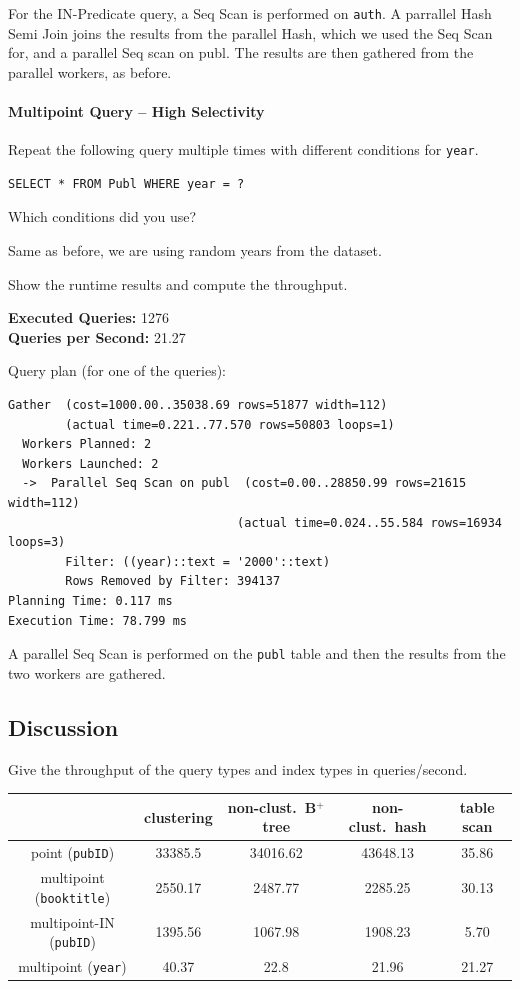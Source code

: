 \documentclass[11pt]{scrartcl}
\begin{document}
For the IN-Predicate query, a Seq Scan is performed on \texttt{auth}.
A parrallel Hash Semi Join joins the results from the parallel Hash, which we used the Seq Scan for, and a parallel Seq
scan on publ.
The results are then gathered from the parallel workers, as before.

\paragraph{Multipoint Query -- High Selectivity}

Repeat the following query multiple times with different conditions for \texttt{year}.

\begin{lstlisting}[style=dbtsql]
SELECT * FROM Publ WHERE year = ?
\end{lstlisting}

Which conditions did you use?

Same as before, we are using random years from the dataset.

Show the runtime results and compute the throughput.

\textbf{Executed Queries: } 1276\\
\textbf{Queries per Second: } 21.27

Query plan (for one of the queries):

{\small
\parskip0pt\begin{verbatim}
Gather  (cost=1000.00..35038.69 rows=51877 width=112)
        (actual time=0.221..77.570 rows=50803 loops=1)
  Workers Planned: 2
  Workers Launched: 2
  ->  Parallel Seq Scan on publ  (cost=0.00..28850.99 rows=21615 width=112)
                                (actual time=0.024..55.584 rows=16934 loops=3)
        Filter: ((year)::text = '2000'::text)
        Rows Removed by Filter: 394137
Planning Time: 0.117 ms
Execution Time: 78.799 ms
\end{verbatim}}

A parallel Seq Scan is performed on the \texttt{publ} table and then the results from the two workers are gathered.

\subsection*{Discussion}

Give the throughput of the query types and index types in queries/second.
\begin{table}[H]
  \centering
  \begin{tabular}{c|c|c|c|c}
    & clustering & non-clust.\ B$^+$ tree & non-clust.\ hash & table scan
      \tabularnewline
    \hline
    point (\texttt{pubID}) & 33385.5 & 34016.62 & 43648.13 & 35.86 \tabularnewline
    \hline
    multipoint (\texttt{booktitle}) & 2550.17 & 2487.77 & 2285.25 & 30.13
      \tabularnewline
    \hline
		multipoint-IN (\texttt{pubID}) & 1395.56 & 1067.98 & 1908.23 & 5.70
      \tabularnewline
		\hline
    multipoint (\texttt{year}) & 40.37 & 22.8 & 21.96 & 21.27
      \tabularnewline
  \end{tabular}
\end{table}
\end{document}
